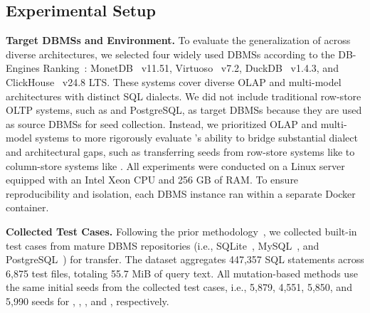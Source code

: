 \documentclass[conference]{IEEEtran}
\begin{document}
\subsection{Experimental Setup}
\label{sec:setup}

\textbf{Target DBMSs and Environment.}
To evaluate the generalization of \tool{} across diverse architectures, we selected four widely used DBMSs according to the DB-Engines Ranking~\cite{dbengines}: MonetDB~\cite{monetdb} v11.51, Virtuoso~\cite{virtuoso} v7.2, DuckDB~\cite{duckdb_git} v1.4.3, and ClickHouse~\cite{clickhouse} v24.8 LTS. These systems cover diverse OLAP and multi-model architectures with distinct SQL dialects.
We did not include traditional row-store OLTP systems, such as \mysql{} and PostgreSQL, as target DBMSs because they are used as source DBMSs for seed collection. Instead, we prioritized OLAP and multi-model systems to more rigorously evaluate \tool{}'s ability to bridge substantial dialect and architectural gaps, such as transferring seeds from row-store systems like \mysql{} to column-store systems like \duckdb{}.
All experiments were conducted on a Linux server equipped with an Intel Xeon CPU and 256 GB of RAM. To ensure reproducibility and isolation, each DBMS instance ran within a separate Docker container.

\textbf{Collected Test Cases.}
Following the prior methodology~\cite{fu2024sedar}, we collected built-in test cases from mature DBMS repositories (i.e., SQLite~\cite{sqlite}, MySQL~\cite{mysql}, and PostgreSQL~\cite{pg}) for transfer. 
The dataset aggregates 447,357 SQL statements across 6,875 test files, totaling 55.7 MiB of query text.
All mutation-based methods use the same initial seeds from the collected test cases, i.e., 5,879, 4,551, 5,850, and 5,990 seeds for \monetdb{}, \virtuoso{}, \duckdb{}, and \clickhouse{}, respectively.

\end{document}
